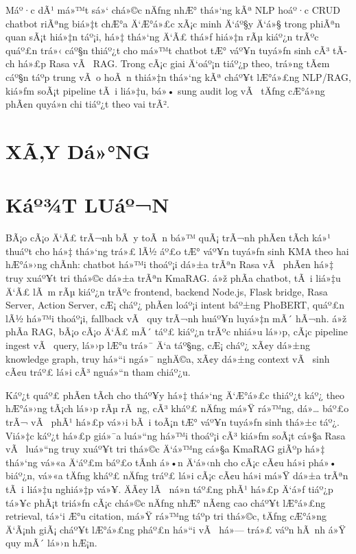 ﻿\documentclass[12pt,a4paper]{report}
\begin{document}
Máº·c dÃ¹ má»™t sá»‘ chá»©c nÄƒng nhÆ° thá»‘ng kÃª NLP hoáº·c CRUD chatbot riÃªng biá»‡t chÆ°a Ä‘Æ°á»£c xÃ¡c minh Ä‘áº§y Ä‘á»§ trong phiÃªn quan sÃ¡t hiá»‡n táº¡i, há»‡ thá»‘ng Ä‘Ã£ thá»ƒ hiá»‡n rÃµ kiáº¿n trÃºc quáº£n trá»‹ cáº§n thiáº¿t cho má»™t chatbot tÆ° váº¥n tuyá»ƒn sinh cÃ³ tÃ­ch há»£p Rasa vÃ  RAG. Trong cÃ¡c giai Ä‘oáº¡n tiáº¿p theo, trá»ng tÃ¢m cáº§n táº­p trung vÃ o hoÃ n thiá»‡n thá»‘ng kÃª cháº¥t lÆ°á»£ng NLP/RAG, kiá»ƒm soÃ¡t pipeline tÃ i liá»‡u, bá»• sung audit log vÃ  tÄƒng cÆ°á»ng phÃ¢n quyá»n chi tiáº¿t theo vai trÃ².


\endgroup

% 
\chapter{XÃ‚Y Dá»°NG}
\label{chap:implementation}



\clearpage
\chapter*{Káº¾T LUáº¬N}
{}

BÃ¡o cÃ¡o Ä‘Ã£ trÃ¬nh bÃ y toÃ n bá»™ quÃ¡ trÃ¬nh phÃ¢n tÃ­ch ká»¹ thuáº­t cho há»‡ thá»‘ng trá»£ lÃ½ áº£o tÆ° váº¥n tuyá»ƒn sinh KMA theo hai hÆ°á»›ng chÃ­nh: chatbot há»™i thoáº¡i dá»±a trÃªn Rasa vÃ  phÃ¢n há»‡ truy xuáº¥t tri thá»©c dá»±a trÃªn KmaRAG. á»ž phÃ­a chatbot, tÃ i liá»‡u Ä‘Ã£ lÃ m rÃµ kiáº¿n trÃºc frontend, backend Node.js, Flask bridge, Rasa Server, Action Server, cÆ¡ cháº¿ phÃ¢n loáº¡i intent báº±ng PhoBERT, quáº£n lÃ½ há»™i thoáº¡i, fallback vÃ  quy trÃ¬nh huáº¥n luyá»‡n mÃ´ hÃ¬nh. á»ž phÃ­a RAG, bÃ¡o cÃ¡o Ä‘Ã£ mÃ´ táº£ kiáº¿n trÃºc nhiá»u lá»›p, cÃ¡c pipeline ingest vÃ  query, lá»›p lÆ°u trá»¯ Ä‘a táº§ng, cÆ¡ cháº¿ xÃ¢y dá»±ng knowledge graph, truy há»“i ngá»¯ nghÄ©a, xÃ¢y dá»±ng context vÃ  sinh cÃ¢u tráº£ lá»i cÃ³ nguá»“n tham chiáº¿u.

Káº¿t quáº£ phÃ¢n tÃ­ch cho tháº¥y há»‡ thá»‘ng Ä‘Æ°á»£c thiáº¿t káº¿ theo hÆ°á»›ng tÃ¡ch lá»›p rÃµ rÃ ng, cÃ³ kháº£ nÄƒng má»Ÿ rá»™ng, dá»… báº£o trÃ¬ vÃ  phÃ¹ há»£p vá»›i bÃ i toÃ¡n tÆ° váº¥n tuyá»ƒn sinh thá»±c táº¿. Viá»‡c káº¿t há»£p giá»¯a luá»“ng há»™i thoáº¡i cÃ³ kiá»ƒm soÃ¡t cá»§a Rasa vÃ  luá»“ng truy xuáº¥t tri thá»©c Ä‘á»™ng cá»§a KmaRAG giÃºp há»‡ thá»‘ng vá»«a Ä‘áº£m báº£o tÃ­nh á»•n Ä‘á»‹nh cho cÃ¡c cÃ¢u há»i phá»• biáº¿n, vá»«a tÄƒng kháº£ nÄƒng tráº£ lá»i cÃ¡c cÃ¢u há»i má»Ÿ dá»±a trÃªn tÃ i liá»‡u nghiá»‡p vá»¥. ÄÃ¢y lÃ  ná»n táº£ng phÃ¹ há»£p Ä‘á»ƒ tiáº¿p tá»¥c phÃ¡t triá»ƒn cÃ¡c chá»©c nÄƒng nhÆ° nÃ¢ng cao cháº¥t lÆ°á»£ng retrieval, tá»‘i Æ°u citation, má»Ÿ rá»™ng táº­p tri thá»©c, tÄƒng cÆ°á»ng Ä‘Ã¡nh giÃ¡ cháº¥t lÆ°á»£ng pháº£n há»“i vÃ  há»— trá»£ váº­n hÃ nh á»Ÿ quy mÃ´ lá»›n hÆ¡n.
\end{document}

